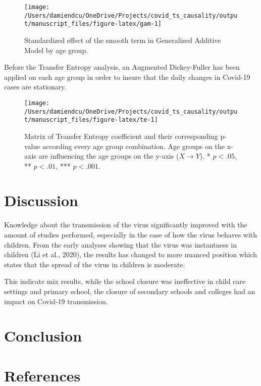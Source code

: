 \documentclass[]{elsarticle} %
\begin{document}
\begin{figure}
\texttt{[image: /Users/damiendcu/OneDrive/Projects/covid\_ts\_causality/output/manuscript\_files/figure-latex/gam-1]} \caption{Standardized effect of the smooth term in Generalized Additive Model by age group.}\label{fig:gam}
\end{figure}

Before the Transfer Entropy analysis, an Augmented Dickey-Fuller has been applied on each age group in order to insure that the daily changes in Covid-19 cases are stationary.

\begin{figure}
\texttt{[image: /Users/damiendcu/OneDrive/Projects/covid\_ts\_causality/output/manuscript\_files/figure-latex/te-1]} \caption{Matrix of Transfer Entropy coefficient and their corresponding p-value according every age group combination. Age groups on the x-axis are influencing the age groups on the y-axis (\(X \rightarrow Y\)). * \(p < .05\), ** \(p < .01\), *** \(p < .001\).}\label{fig:te}
\end{figure}

\hypertarget{discussion}{%
\section{Discussion}\label{discussion}}

Knowledge about the transmission of the virus significantly improved with the amount of studies performed, especially in the case of how the virus behaves with children. From the early analyses showing that the virus was instantness in children (Li et al., 2020), the results has changed to more nuanced position which states that the spread of the virus in children is moderate.

This indicate mix results, while the school closure was ineffective in child care settings and primary school, the closure of secondary schools and colleges had an impact on Covid-19 transmission.

\hypertarget{conclusion}{%
\section{Conclusion}\label{conclusion}}

\hypertarget{references}{%
\section*{References}\label{references}}
\end{document}
